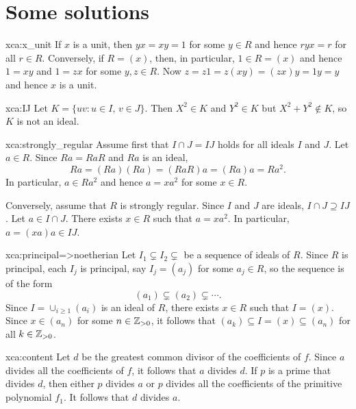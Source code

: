 \chapter*{Some solutions}

\pagestyle{plain}
\fancyhf{}
\fancyfoot[CE,CO]{\leftmark}
\fancyfoot[LE,RO]{\thepage}


\begin{sol}{xca:x_unit}
If $x$ is a unit, then $yx=xy=1$ for some $y\in R$ and hence $ryx=r$ for all $r\in R$. Conversely, 
if $R=(x)$, then, in particular, $1\in R=(x)$ and hence $1=xy$ and $1=zx$ for some $y,z\in R$. Now
$z=z1=z(xy)=(zx)y=1y=y$ and hence $x$ is a unit. 
\end{sol}

\begin{sol}{xca:IJ}
    Let $K=\{uv:u\in I,\,v\in J\}$. Then
    $X^2\in K$ and $Y^2\in K$ but $X^2+Y^2\not\in K$, so $K$ is not an ideal.
\end{sol}

\begin{sol}{xca:strongly_regular}
    Assume first that $I\cap J=IJ$ holds for all ideals $I$ and $J$. 
    Let $a\in R$. Since $Ra=RaR$ and
    $Ra$ is an ideal, 
    \[
    Ra=(Ra)(Ra)=(RaR)a=(Ra)a=Ra^2.
    \]
    In particular, $a\in Ra^2$ and 
    hence $a=xa^2$ for some $x\in R$. 
    
    Conversely, assume that $R$ is strongly regular. Since $I$ and $J$ are
    ideals, $I\cap J\supseteq IJ$. 
    Let $a\in I\cap J$. There exists $x\in R$ such that
    $a=xa^2$. In particular, 
    $a=(xa)a\in IJ$.
\end{sol}


\begin{sol}{xca:principal=>noetherian}
	Let $I_1\subsetneq I_2\subsetneq$ be a sequence of ideals of $R$.  
	Since $R$ is principal, each $I_j$ is principal, 
	say $I_j=(a_j)$ for some $a_j\in R$, so the sequence is of the form
	\[
	(a_1)\subsetneq (a_2)\subsetneq\cdots.
	\]
	Since $I=\cup_{i\geq1}(a_i)$ is an ideal of $R$, 
	there exists $x\in R$ such that $I=(x)$. Since $x\in (a_n)$ for some $n\in\mathbb{Z}_{>0}$, 
	it follows that $(a_k)\subseteq I=(x)\subseteq (a_n)$ for all $k\in\mathbb{Z}_{>0}$. 
\end{sol}

\begin{sol}{xca:content}
	Let $d$ be 
	the greatest common divisor
	of the coefficients of $f$. 
	Since $a$ divides all the coefficients of $f$, it follows that $a$ divides $d$. If $p$ is a prime that
	divides $d$, then either $p$ divides $a$ or $p$ divides all the coefficients of the primitive
	polynomial $f_1$. It follows that $d$ divides $a$.    
\end{sol}

